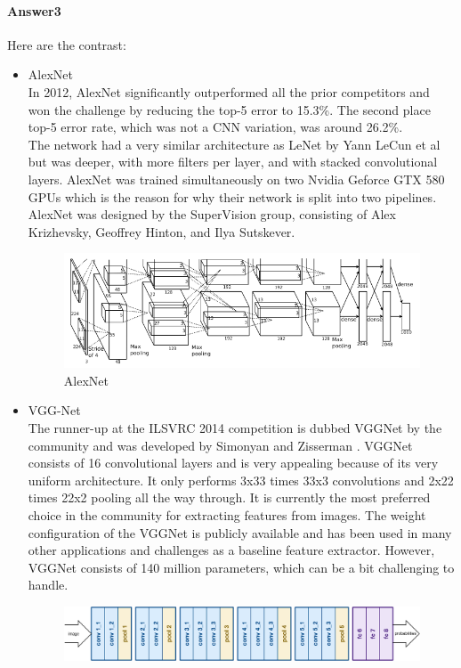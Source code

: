 \documentclass[paper=a4, fontsize=11pt]{scrartcl} %
\numberwithin{equation}{section} %
\numberwithin{figure}{section} %
\numberwithin{table}{section} %
\begin{document}
\paragraph{\textbf{Answer3}}
Here are the contrast:
\begin{itemize}
  \item AlexNet
 	 \\ In 2012, AlexNet significantly outperformed all the prior competitors and won the challenge by reducing the top-5 error to 15.3\%. The second place top-5 error rate, which was not a CNN variation, was around 26.2\%.
  	\\ The network had a very similar architecture as LeNet by Yann LeCun et al but was deeper, with more filters per layer, and with stacked convolutional layers. AlexNet was trained simultaneously on two Nvidia Geforce GTX 580 GPUs which is the reason for why their network is split into two pipelines. AlexNet was designed by the SuperVision group, consisting of Alex Krizhevsky, Geoffrey Hinton, and Ilya Sutskever.
	\begin{figure}[H]
 		\centering
 		\includegraphics[scale=0.5]{./alexnet.png}
 		\caption{AlexNet}
 		\label{fig:alexnet}
 	\end{figure}
  \item VGG-Net
  	\\ The runner-up at the ILSVRC 2014 competition is dubbed VGGNet by the community and was developed by Simonyan and Zisserman . VGGNet consists of 16 convolutional layers and is very appealing because of its very uniform architecture. It only performs 3x33 times 33x3 convolutions and 2x22 times 22x2 pooling all the way through. It is currently the most preferred choice in the community for extracting features from images. The weight configuration of the VGGNet is publicly available and has been used in many other applications and challenges as a baseline feature extractor. However, VGGNet consists of 140 million parameters, which can be a bit challenging to handle.
	\begin{figure}[H]
 		\centering
 		\includegraphics[scale=0.3]{./vggnet.png}

\end{figure}
\end{itemize}
\end{document}
